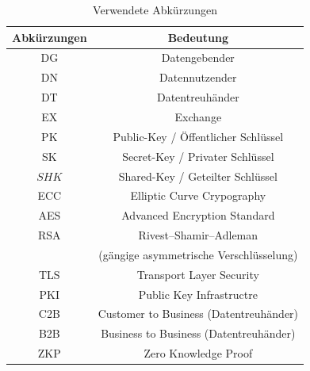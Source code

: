 \documentclass[
	fontsize=11pt,
	headings=small,
	parskip=half,           %
	bibliography=totoc,
	numbers=noenddot,       %
	open=any,               %
]{scrreprt}
\begin{document}
\begin{table}[H]
    \centering
    \begin{tabular}{|c|c|}
        \hline
        \textbf{Abkürzungen} & \textbf{Bedeutung} \\
        \hline
        DG & Datengebender \\
        \hline
        DN & Datennutzender \\
        \hline
        DT & Datentreuhänder \\
        \hline
        EX &Exchange \\
        \hline
        PK & Public-Key / Öffentlicher Schlüssel \\
        \hline
        SK & Secret-Key / Privater Schlüssel \\
        \hline
        $SHK$ & Shared-Key / Geteilter Schlüssel \\
        \hline
        ECC & Elliptic Curve Crypography \\
        \hline
        AES & Advanced Encryption Standard \\
        \hline
        RSA & Rivest–Shamir–Adleman \\ & (gängige asymmetrische Verschlüsselung) \\
        \hline
        TLS & Transport Layer Security \\
        \hline
        PKI & Public Key Infrastructre\\
        \hline
        C2B & Customer to Business (Datentreuhänder)\\
        \hline
        B2B & Business to Business (Datentreuhänder)\\
        \hline
        ZKP & Zero Knowledge Proof \\
        \hline
    \end{tabular}
    \caption{Verwendete Abkürzungen}
    \label{tab:abkürzungen}
\end{table}
\end{document}
